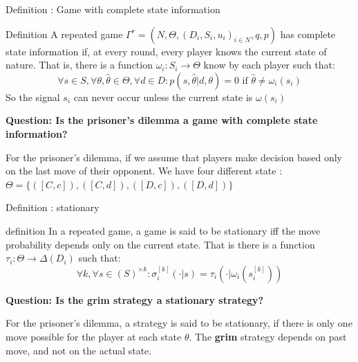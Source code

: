 \begin{frame}{Definition : Game with complete state information}

\begin{block}{Definition}
A repeated game $\Gamma^r = (N,\Theta, (D_i,S_i,u_i)_{i\in N},q,p)$ has {\color{green}complete state information} if, at every round, every player knows the current state of nature. That is, there is a function $\omega_i:S_i \rightarrow \Theta$ know by each player such that:
\begin{equation*}
    \forall s \in S, \forall \theta, \hat{\theta} \in \Theta, \forall d \in D : p(s,\hat{\theta} | d,\theta) = 0 \text{ if } \hat{\theta} \neq \omega_i(s_i)
\end{equation*}
So the signal $s_i$ can never occur unless the current state is $\omega(s_i)$
\end{block}

\pause
\textbf{Question: Is the prisoner's dilemma a game with complete state information?}
\pause

For the prisoner's dilemma, if we assume that \alert{players make decision based only on the last move of their opponent}. We have four different state : $\Theta = \{([C,c]), ([C,d]), ([D,c]), ([D,d])\}$

\end{frame}

\begin{frame}{Definition : stationary}

\begin{block}{definition}
In a repeated game, a game is said to be {\color{green}stationary} iff the move probability depends only on the current state. That is there is a function $\tau_i : \Theta \rightarrow \Delta(D_i)$ such that:
\begin{equation*}
	\forall k, \forall s \in (S)^{\times k} : \sigma_i^{[k]}(\cdot | s) = \tau_i(\cdot | \omega_i(s_i^{[k]}))
\end{equation*}
\end{block}

\pause
\textbf{Question: Is the grim strategy a stationary strategy?}
\pause

For the prisoner's dilemma, a strategy is said to be stationary, if there is only one move possible for the player at each state $\theta$. The \textbf{grim} strategy depends on past move, and not on the actual state.

\end{frame}

